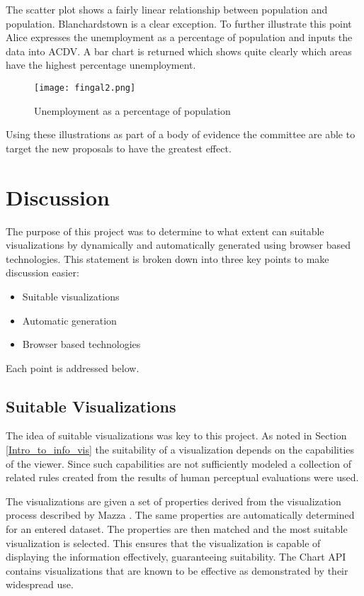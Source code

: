 \documentclass[a4paper, 11pt, titlepage, onehalfspacing]{report}
\begin{document}
The scatter plot shows a fairly linear relationship between population and population.  Blanchardstown is a clear exception. To further illustrate this point Alice expresses the unemployment as a percentage of population and inputs the data into AC\lightning{}DV. A bar chart is returned which shows quite clearly which areas have the highest percentage unemployment. 

\begin{figure}[htp] \centering
\texttt{[image: fingal2.png]}
\caption{Unemployment as a percentage of population}
\label{fingal1}
\end{figure}


Using these illustrations as part of a body of evidence the committee are able to target the new proposals to have the greatest effect.

\section{Discussion}
\label{Discussion}
The purpose of this project was to determine to what extent can suitable visualizations by dynamically and automatically generated using browser based technologies. This statement is broken down into three key points to make discussion easier:

\begin{itemize}
\item Suitable visualizations
\item Automatic generation
\item Browser based technologies
\end{itemize}

Each point is addressed below.

\subsection{Suitable Visualizations}
The idea of suitable visualizations was key to this project. As noted in Section \ref{Intro_to_info_vis} the suitability of a visualization depends on the capabilities of the viewer. Since such capabilities are not sufficiently modeled a collection of related rules created from the results of human perceptual evaluations were used.

The visualizations are given a set of properties derived from the visualization process described by Mazza \cite{mazza2009introduction}. The same properties are automatically determined for an entered dataset. The properties are then matched and the most suitable visualization is selected. This ensures that the visualization is capable of displaying the information effectively, guaranteeing suitability. The Chart API contains visualizations that are known to be effective as demonstrated by their widespread use.
\end{document}
